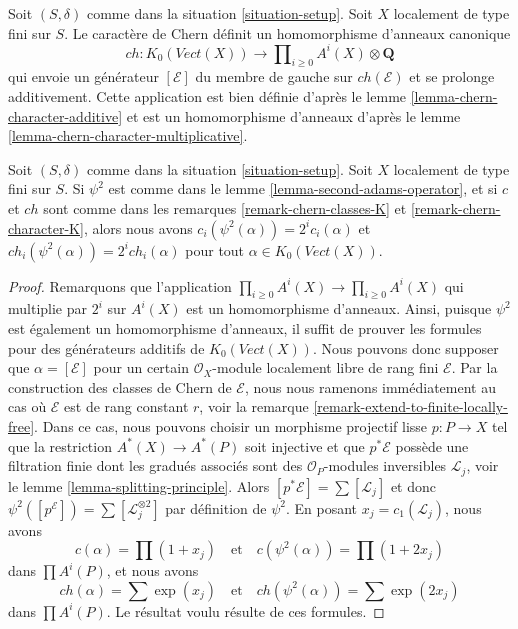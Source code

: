 \begin{remark}
\label{remark-chern-character-K}
Soit $(S, \delta)$ comme dans la situation \ref{situation-setup}.
Soit $X$ localement de type fini sur $S$. Le caractère de Chern
définit un homomorphisme d'anneaux canonique
$$
ch : K_0(\textit{Vect}(X)) \longrightarrow
\prod\nolimits_{i \geq 0} A^i(X) \otimes \mathbf{Q}
$$
qui envoie un générateur $[\mathcal{E}]$ du membre de gauche sur
$ch(\mathcal{E})$ et se prolonge additivement. Cette application est bien définie
d'après le lemme \ref{lemma-chern-character-additive} et est un homomorphisme d'anneaux d'après le
lemme \ref{lemma-chern-character-multiplicative}.
\end{remark}

\begin{lemma}
\label{lemma-adams-and-chern}
Soit $(S, \delta)$ comme dans la situation \ref{situation-setup}.
Soit $X$ localement de type fini sur $S$. Si $\psi^2$ est
comme dans le lemme \ref{lemma-second-adams-operator}, et si $c$ et $ch$ sont comme dans les
remarques \ref{remark-chern-classes-K} et \ref{remark-chern-character-K},
alors nous avons $c_i(\psi^2(\alpha)) = 2^i c_i(\alpha)$ et
$ch_i(\psi^2(\alpha)) = 2^i ch_i(\alpha)$
pour tout $\alpha \in K_0(\textit{Vect}(X))$.
\end{lemma}

\begin{proof}
Remarquons que l'application $\prod_{i \geq 0} A^i(X) \to \prod_{i \geq 0} A^i(X)$
qui multiplie par $2^i$ sur $A^i(X)$ est un homomorphisme d'anneaux. Ainsi, puisque $\psi^2$
est également un homomorphisme d'anneaux, il suffit de prouver les formules pour des générateurs additifs
de $K_0(\textit{Vect}(X))$. Nous pouvons donc supposer que $\alpha = [\mathcal{E}]$
pour un certain $\mathcal{O}_X$-module localement libre de rang fini $\mathcal{E}$.
Par la construction des classes de Chern de $\mathcal{E}$, nous nous
ramenons immédiatement au cas où $\mathcal{E}$ est de rang constant $r$, voir la
remarque \ref{remark-extend-to-finite-locally-free}.
Dans ce cas, nous pouvons choisir un morphisme projectif lisse $p : P \to X$
tel que la restriction $A^*(X) \to A^*(P)$ soit injective
et que $p^*\mathcal{E}$ possède une filtration finie dont les
gradués associés sont des $\mathcal{O}_P$-modules inversibles $\mathcal{L}_j$, voir le
lemme \ref{lemma-splitting-principle}. Alors
$[p^*\mathcal{E}] = \sum [\mathcal{L}_j]$ et donc
$\psi^2([p^\mathcal{E}]) = \sum [\mathcal{L}_j^{\otimes 2}]$
par définition de $\psi^2$. En posant $x_j  = c_1(\mathcal{L}_j)$,
nous avons
$$
c(\alpha) = \prod (1 + x_j)
\quad\text{et}\quad
c(\psi^2(\alpha)) = \prod (1 + 2 x_j)
$$
dans $\prod A^i(P)$, et nous avons
$$
ch(\alpha) = \sum \exp(x_j)
\quad\text{et}\quad
ch(\psi^2(\alpha)) = \sum \exp(2 x_j)
$$
dans $\prod A^i(P)$. Le résultat voulu résulte de ces formules.
\end{proof}


